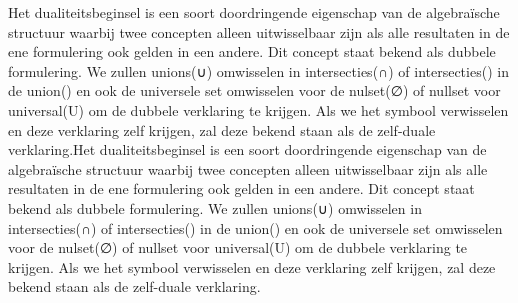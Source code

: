 \documentclass{article}
\begin{document}
	Het dualiteitsbeginsel is een soort doordringende eigenschap van de algebraïsche structuur waarbij twee concepten alleen uitwisselbaar zijn als alle resultaten in de ene formulering ook gelden in een andere. Dit concept staat bekend als dubbele formulering. We zullen unions(∪) omwisselen in intersecties(∩) of intersecties() in de union() en ook de universele set omwisselen voor de nulset(∅) of nullset voor universal(U) om de dubbele verklaring te krijgen. Als we het symbool verwisselen en deze verklaring zelf krijgen, zal deze bekend staan als de zelf-duale verklaring.Het dualiteitsbeginsel is een soort doordringende eigenschap van de algebraïsche structuur waarbij twee concepten alleen uitwisselbaar zijn als alle resultaten in de ene formulering ook gelden in een andere. Dit concept staat bekend als dubbele formulering. We zullen unions(∪) omwisselen in intersecties(∩) of intersecties() in de union() en ook de universele set omwisselen voor de nulset(∅) of nullset voor universal(U) om de dubbele verklaring te krijgen. Als we het symbool verwisselen en deze verklaring zelf krijgen, zal deze bekend staan als de zelf-duale verklaring.
 
	

	
	
\end{document}
